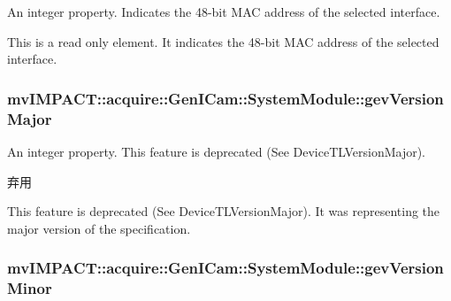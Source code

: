 An integer property. Indicates the 48-\/bit M\+A\+C address of the selected interface. 

This is a read only element. It indicates the 48-\/bit M\+A\+C address of the selected interface. \hypertarget{classmv_i_m_p_a_c_t_1_1acquire_1_1_gen_i_cam_1_1_system_module_a71bc6f8eab54b687fb89575a0af7cf9f}{
\subsubsection[{gev\+Version\+Major}]{ mv\+I\+M\+P\+A\+C\+T\+::acquire\+::\+Gen\+I\+Cam\+::\+System\+Module\+::gev\+Version\+Major}}\label{classmv_i_m_p_a_c_t_1_1acquire_1_1_gen_i_cam_1_1_system_module_a71bc6f8eab54b687fb89575a0af7cf9f}


An integer property. This feature is deprecated (See Device\+T\+L\+Version\+Major). 

\begin{DoxyRefDesc}{弃用}
\item[\hyperlink{deprecated__deprecated000094}{弃用}]This feature is deprecated (See Device\+T\+L\+Version\+Major). It was representing the major version of the specification. \end{DoxyRefDesc}
\hypertarget{classmv_i_m_p_a_c_t_1_1acquire_1_1_gen_i_cam_1_1_system_module_a743cf765f431c037b166db1a2f6ebe31}{
\subsubsection[{gev\+Version\+Minor}]{ mv\+I\+M\+P\+A\+C\+T\+::acquire\+::\+Gen\+I\+Cam\+::\+System\+Module\+::gev\+Version\+Minor}}\label{classmv_i_m_p_a_c_t_1_1acquire_1_1_gen_i_cam_1_1_system_module_a743cf765f431c037b166db1a2f6ebe31}


